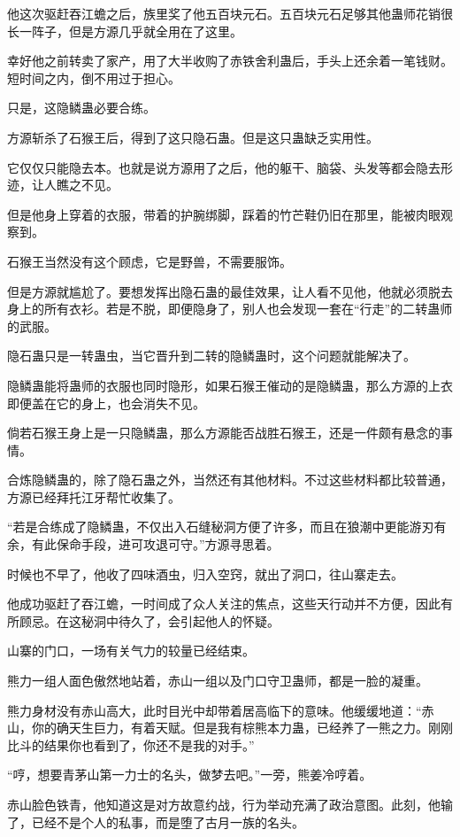 \begin{this_body}
他这次驱赶吞江蟾之后，族里奖了他五百块元石。五百块元石足够其他蛊师花销很长一阵子，但是方源几乎就全用在了这里。

幸好他之前转卖了家产，用了大半收购了赤铁舍利蛊后，手头上还余着一笔钱财。短时间之内，倒不用过于担心。

只是，这隐鳞蛊必要合练。

方源斩杀了石猴王后，得到了这只隐石蛊。但是这只蛊缺乏实用性。

它仅仅只能隐去本。也就是说方源用了之后，他的躯干、脑袋、头发等都会隐去形迹，让人瞧之不见。

但是他身上穿着的衣服，带着的护腕绑脚，踩着的竹芒鞋仍旧在那里，能被肉眼观察到。

石猴王当然没有这个顾虑，它是野兽，不需要服饰。

但是方源就尴尬了。要想发挥出隐石蛊的最佳效果，让人看不见他，他就必须脱去身上的所有衣衫。若是不脱，即便隐身了，别人也会发现一套在“行走”的二转蛊师的武服。

隐石蛊只是一转蛊虫，当它晋升到二转的隐鳞蛊时，这个问题就能解决了。

隐鳞蛊能将蛊师的衣服也同时隐形，如果石猴王催动的是隐鳞蛊，那么方源的上衣即便盖在它的身上，也会消失不见。

倘若石猴王身上是一只隐鳞蛊，那么方源能否战胜石猴王，还是一件颇有悬念的事情。

合炼隐鳞蛊的，除了隐石蛊之外，当然还有其他材料。不过这些材料都比较普通，方源已经拜托江牙帮忙收集了。

“若是合练成了隐鳞蛊，不仅出入石缝秘洞方便了许多，而且在狼潮中更能游刃有余，有此保命手段，进可攻退可守。”方源寻思着。

时候也不早了，他收了四味酒虫，归入空窍，就出了洞口，往山寨走去。

他成功驱赶了吞江蟾，一时间成了众人关注的焦点，这些天行动并不方便，因此有所顾忌。在这秘洞中待久了，会引起他人的怀疑。

山寨的门口，一场有关气力的较量已经结束。

熊力一组人面色傲然地站着，赤山一组以及门口守卫蛊师，都是一脸的凝重。

熊力身材没有赤山高大，此时目光中却带着居高临下的意味。他缓缓地道：“赤山，你的确天生巨力，有着天赋。但是我有棕熊本力蛊，已经养了一熊之力。刚刚比斗的结果你也看到了，你还不是我的对手。”

“哼，想要青茅山第一力士的名头，做梦去吧。”一旁，熊姜冷哼着。

赤山脸色铁青，他知道这是对方故意约战，行为举动充满了政治意图。此刻，他输了，已经不是个人的私事，而是堕了古月一族的名头。


\end{this_body}
